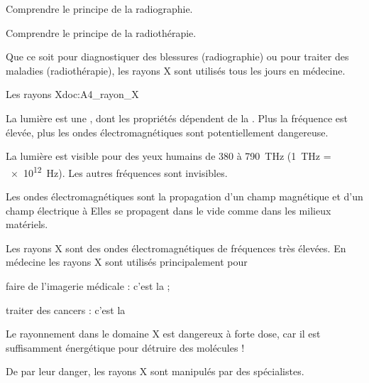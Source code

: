 \teteTermStssImag

\vspace*{-36pt}


\begin{objectifs}
  \item Comprendre le principe de la radiographie.
  \item Comprendre le principe de la radiothérapie.
\end{objectifs}

\begin{contexte}
  Que ce soit pour diagnostiquer des blessures (radiographie) ou pour traiter des maladies (radiothérapie), les rayons X sont utilisés tous les jours en médecine.

\end{contexte}


\begin{doc}{Les rayons X}{doc:A4_rayon_X}
  \begin{center}  
  \end{center}
  
  La lumière est une , dont les propriétés dépendent de la .
  Plus la fréquence est élevée, plus les ondes électromagnétiques sont potentiellement dangereuse.
  
  La lumière est visible pour des yeux humains de 380 à \qty{790}{\tera\hertz} (\qty{1}{\tera\hertz} = \qty{e12}{\hertz}).
  Les autres fréquences sont invisibles.

  Les ondes électromagnétiques sont la propagation d'un champ magnétique et d'un champ électrique à 
  Elles se propagent dans le vide comme dans les milieux matériels.
  
  \begin{importants}
    Les rayons X sont des ondes électromagnétiques de fréquences très élevées.
    En médecine les rayons X sont utilisés principalement pour
    \begin{listePoints}  
      \item faire de l'imagerie médicale : c'est la  ;
      \item traiter des cancers : c'est la 
    \end{listePoints}
  \end{importants}

  Le rayonnement dans le domaine X est dangereux à forte dose, car il est suffisamment énergétique pour détruire des molécules !

  De par leur danger, les rayons X sont manipulés par des spécialistes.
\end{doc}

